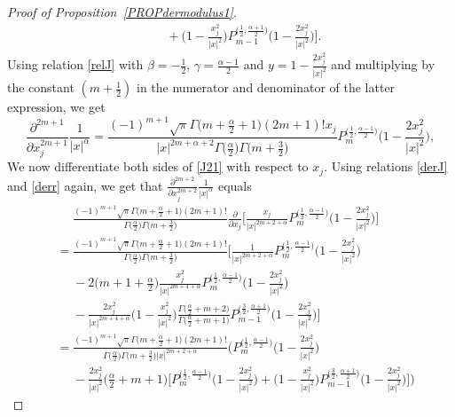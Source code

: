 \documentclass[reqno,11pt]{amsart}
\theoremstyle{definition}
\begin{document}
\begin{proof}[Proof of Proposition~\ref{PROPdermodulus1}]
\begin{align*}
		&\phantom{=}  +\bigg(1-\frac{x_j^2}{|x|^2}\bigg)P_{m-1}^{\big(\frac{1}{2}, \frac{\alpha+1}{2}\big)}\bigg(1-\frac{2x_j^2}{|x|^2}\bigg)\bigg].
	\end{align*}	
	Using relation \eqref{relJ} with $\beta=-\frac{1}{2}$, $\gamma= \frac{\alpha-1}{2}$ and $y=1-\frac{2x_j^2}{|x|^2}$ and multiplying by the constant $(m+\frac{1}{2})$ in the numerator and denominator of the latter expression, we get
	\begin{equation*}
		\label{J2prime}
		\frac{\partial^{2m+1}}{\partial x_j^{2m+1}}\frac{1}{|x|^{\alpha}}=\frac{(-1)^{m+1} \sqrt{\pi} \Gamma\big( m+\frac{\alpha}{2}+1\big) (2m+1)!x_j} {|x|^{2m+\alpha+2}\Gamma\big(\frac{\alpha}{2}\big)\Gamma\big( m+\frac{3}{2}\big)}P_m^{\big(\frac{1}{2}, \frac{\alpha-1}{2}\big)}\bigg(1-\frac{2x_j^2}{|x|^2}\bigg),
	\end{equation*}
	We now differentiate both sides of \eqref{J21} with respect to $x_j$. Using relations \eqref{derJ} and \eqref{derr} again, we get that $\frac{\partial^{2m+2}}{\partial x_j^{2m+2}}\frac{1}{|x|^\alpha}$ equals
	\begin{align*}
		&\phantom{=}\frac{(-1)^{m+1} \sqrt{\pi} \Gamma \big(m+\frac{\alpha}{2}+1\big) (2m+1)!}{\Gamma \big(\frac{\alpha}{2}\big) \Gamma \big(m+\frac{3}{2}\big)} \frac{\partial}{\partial x_j} \bigg[ \frac{x_j}{|x|^{2m+2+\alpha}} P_m^{\big(\frac{1}{2}, \frac{\alpha-1}{2}\big)} \bigg(1-\frac{2x_j^2}{|x|^2}\bigg)\bigg]\\
		&=\frac{(-1)^{m+1} \sqrt{\pi} \Gamma \big(m+\frac{\alpha}{2}+1\big) (2m+1)!}{\Gamma \big(\frac{\alpha}{2}\big) \Gamma \big(m+\frac{3}{2}\big)} \bigg[\frac{1}{|x|^{2m+2+\alpha}} P_m^{\big(\frac{1}{2}, \frac{\alpha-1}{2}\big)} \bigg(1-\frac{2x_j^2}{|x|^2}\bigg) \\
		& \phantom{=}-2 \Big(m+1+\frac{\alpha}{2}\Big) \frac{x_j^2}{|x|^{2m+4+\alpha}}P_m^{\big(\frac{1}{2}, \frac{\alpha-1}{2}\big)}\bigg(1-\frac{2x_j^2}{|x|^2}\bigg)\\
		& \phantom{=}-\frac{2x_j^2}{|x|^{2m+4+\alpha}} \bigg(1-\frac{x_j^2}{|x|^2}\bigg) \frac{\Gamma\big(\frac{\alpha}{2}+m+2\big)}{\Gamma\big(\frac{\alpha}{2}+m+1\big)}P_{m-1}^{\big(\frac{3}{2}, \frac{\alpha+1}{2}\big)} \bigg(1-\frac{2x_j^2}{|x|^2}\bigg) \bigg]\\	
		&= \frac{(-1)^{m+1} \sqrt{\pi} \Gamma \big(m+\frac{\alpha}{2}+1\big) (2m+1)!}{\Gamma \big(\frac{\alpha}{2}\big) \Gamma \big(m+\frac{3}{2}\big) |x|^{2m+2+\alpha}} \bigg(P_m^{\big(\frac{1}{2}, \frac{\alpha-1}{2}\big)}\bigg(1-\frac{2x_j^2}{|x|^2}\bigg) \\
		&\phantom{=} -\frac{2x_j^2}{|x|^2}\Big(\frac{\alpha}{2}+m+1\Big)\bigg[P_m^{\big(\frac{1}{2},\frac{\alpha-1}{2}\big)}\bigg(1-\frac{2x_j^2}{|x|^2}\bigg)+\bigg(1-\frac{x_j^2}{|x|^2}\bigg)P_{m-1}^{\big(\frac{3}{2}, \frac{\alpha+1}{2}\big)}\bigg(1-\frac{2x_j^2}{|x|^2}\bigg)  \bigg] \bigg)	

\end{align*}
\end{proof}
\end{document}
